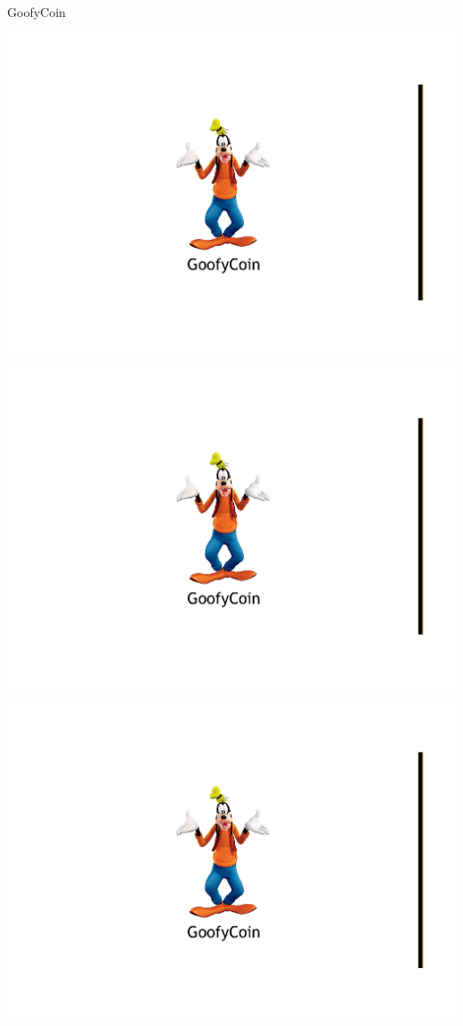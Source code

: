 \begin{frame}{GoofyCoin}
\begin{overprint}
\begin{center}
\includegraphics[width=\textwidth,page=3]{goofy-coin}
\end{center}
\begin{center}
\includegraphics[width=\textwidth,page=4]{goofy-coin}
\end{center}
\begin{center}
\includegraphics[width=\textwidth,page=5]{goofy-coin}
\end{center}
\end{overprint}
	
\end{frame}

